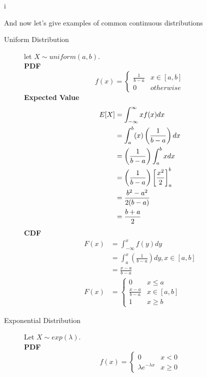 i\documentclass[10pt]{article}
\begin{document}
And now let's give examples of common continuous distributions 
\newpage
\begin{description}
    \item[Uniform Distribution]
        let $ X \sim uniform(a,b)$.  \\
        \textbf{PDF} 
        \[ f(x) = \begin{cases}
                    \frac{1}{b-a} & x \in [a,b] \\
                    0 & otherwise
                  \end{cases} \]
        \textbf{Expected Value}\\
        \begin{align*}
            E[X] &=  \int_{-\infty}^{\infty} xf(x)dx \\
                 &= \int_{a}^{b} (x)\left( \frac{1}{b-a} \right)dx \\
                 &= \left( \frac{1}{b-a} \right) \int_a^b xdx  \\
                 &= \left( \frac{1}{b-a} \right) \left[\frac{x^2}{2}\right]_a^b   \\
                 &= \frac{b^2 - a^2}{2(b-a)} \\
                 &= \frac{b + a}{2}
        \end{align*}
        \textbf{CDF}\\
        \begin{align*} 
            F(x) &= \int_{-\infty}^{x} f(y)dy \\
                 &= \int_{a}^{x} \left(\frac{1}{b-a} \right)dy, x \in [a,b] \\ 
                 &= \frac{x - a}{b -a}\\
            F(x) &= \begin{cases}
                     0 & x \leq a  \\
                     \frac{x-a}{b-a} & x \in [a,b] \\
                     1 & x \geq b 
                    \end{cases}
        \end{align*}
    \newpage
    \item[Exponential Distribution] 
        Let $ X \sim exp(\lambda) $. \\
        \textbf{PDF}
        \[ f(x) = \begin{cases}
                    0 & x < 0 \\
                    \lambda e^{-\lambda x} & x \geq 0
        \end{cases} \]

\end{description}
\end{document}
